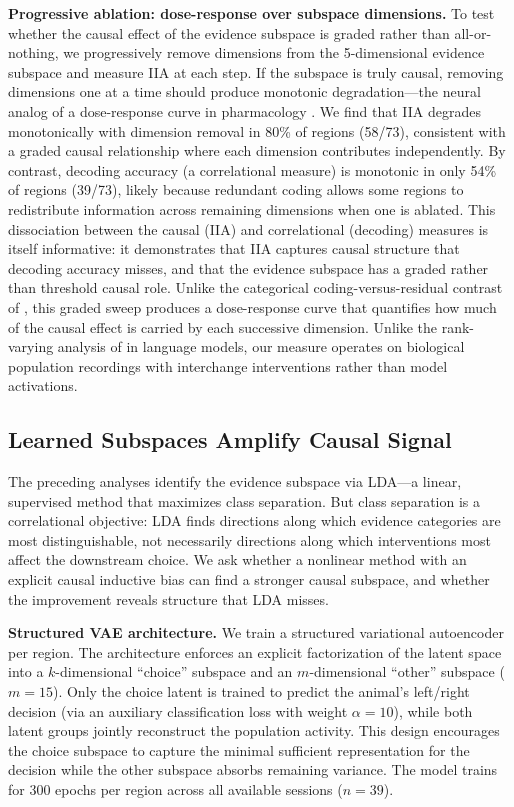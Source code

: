 \documentclass{article}
\begin{document}
\textbf{Progressive ablation: dose-response over subspace dimensions.} To test whether the causal effect of the evidence subspace is graded rather than all-or-nothing, we progressively remove dimensions from the 5-dimensional evidence subspace and measure IIA at each step. If the subspace is truly causal, removing dimensions one at a time should produce monotonic degradation---the neural analog of a dose-response curve in pharmacology \citep{pereira2025residual}. We find that IIA degrades monotonically with dimension removal in 80\% of regions (58/73), consistent with a graded causal relationship where each dimension contributes independently. By contrast, decoding accuracy (a correlational measure) is monotonic in only 54\% of regions (39/73), likely because redundant coding allows some regions to redistribute information across remaining dimensions when one is ablated. This dissociation between the causal (IIA) and correlational (decoding) measures is itself informative: it demonstrates that IIA captures causal structure that decoding accuracy misses, and that the evidence subspace has a graded rather than threshold causal role. Unlike the categorical coding-versus-residual contrast of \citet{pereira2025residual}, this graded sweep produces a dose-response curve that quantifies how much of the causal effect is carried by each successive dimension. Unlike the rank-varying analysis of \citet{lowrank2026llm} in language models, our measure operates on biological population recordings with interchange interventions rather than model activations.

\subsection{Learned Subspaces Amplify Causal Signal}

The preceding analyses identify the evidence subspace via LDA---a linear, supervised method that maximizes class separation. But class separation is a correlational objective: LDA finds directions along which evidence categories are most distinguishable, not necessarily directions along which interventions most affect the downstream choice. We ask whether a nonlinear method with an explicit causal inductive bias can find a stronger causal subspace, and whether the improvement reveals structure that LDA misses.

\textbf{Structured VAE architecture.} We train a structured variational autoencoder \citep{narayanaswamy2017learning} per region. The architecture enforces an explicit factorization of the latent space into a $k$-dimensional ``choice'' subspace and an $m$-dimensional ``other'' subspace ($m = 15$). Only the choice latent is trained to predict the animal's left/right decision (via an auxiliary classification loss with weight $\alpha = 10$), while both latent groups jointly reconstruct the population activity. This design encourages the choice subspace to capture the minimal sufficient representation for the decision while the other subspace absorbs remaining variance. The model trains for 300 epochs per region across all available sessions ($n = 39$).
\end{document}
